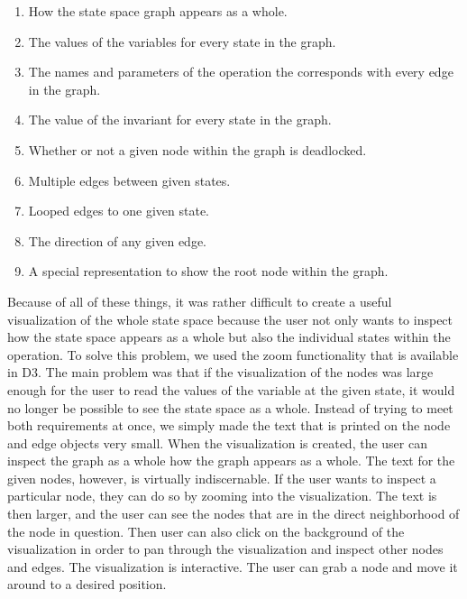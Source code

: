 \begin{enumerate}
\item{How the state space graph appears as a whole.}
\item{The values of the variables for every state in the graph.}
\item{The names and parameters of the operation the corresponds with every edge in the graph.}
\item{The value of the invariant for every state in the graph.}
\item{Whether or not a given node within the graph is deadlocked.}
\item{Multiple edges between given states.}
\item{Looped edges to one given state.}
\item{The direction of any given edge.}
\item{A special representation to show the root node within the graph.}
\end{enumerate}

Because of all of these things, it was rather difficult to create a useful visualization of the whole state space because the user not only wants to inspect how the state space appears as a whole but also the individual states within the operation. To solve this problem, we used the zoom functionality that is available in D3. The main problem was that if the visualization of the nodes was large enough for the user to read the values of the variable at the given state, it would no longer be possible to see the state space as a whole. Instead of trying to meet both requirements at once, we simply made the text that is printed on the node and edge objects very small. When the visualization is created, the user can inspect the graph as a whole how the graph appears as a whole. The text for the given nodes, however, is virtually indiscernable. If the user wants to inspect a particular node, they can do so by zooming into the visualization. The text is then larger, and the user can see the nodes that are in the direct neighborhood of the node in question. Then user can also click on the background of the visualization in order to pan through the visualization and inspect other nodes and edges. The visualization is interactive. The user can grab a node and move it around to a desired position.

